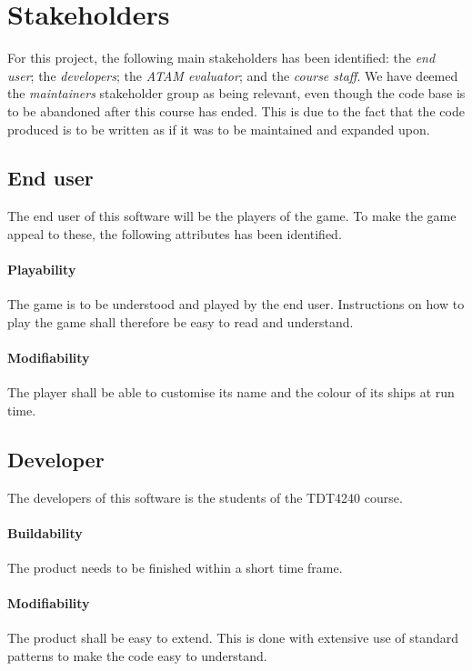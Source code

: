 \chapter{Stakeholders}
\label{cha:stakeholders}
For this project, the following main stakeholders has been identified: the \emph{end user}; the \emph{developers}; the \emph{ATAM evaluator}; and the \emph{course staff}. We have deemed the \emph{maintainers} stakeholder group as being relevant, even though the code base is to be abandoned after this course has ended. This is due to the fact that the code produced is to be written as if it was to be maintained and expanded upon.

    
    \section{End user}
    The end user of this software will be the players of the game. To make the game appeal to these, the following attributes has been identified.

        \subsubsection*{Playability}
        The game is to be understood and played by the end user. Instructions on how to play the game shall therefore be easy to read and understand.

        \subsubsection*{Modifiability}
        The player shall be able to customise its name and the colour of its ships at run time.
    
    
    \section{Developer}
    The developers of this software is the students of the TDT4240 course.

        \subsubsection*{Buildability}
        The product needs to be finished within a short time frame.
        
        \subsubsection*{Modifiability}
        The product shall be easy to extend. This is done with extensive use of standard patterns to make the code easy to understand.


